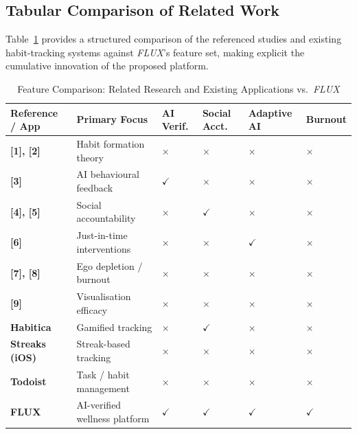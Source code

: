 \documentclass[12pt,a4paper]{article}
\newcommand{\FL}{\textit{FLUX}}
\newcommand{\tick}{\textcolor{fluxgreen}{$\checkmark$}}
\newcommand{\cross}{\textcolor{fluxred}{$\times$}}
\begin{document}
\subsection{Tabular Comparison of Related Work}

Table~\ref{tab:comparison} provides a structured comparison of the referenced studies
and existing habit-tracking systems against \FL{}'s feature set, making explicit the
cumulative innovation of the proposed platform.

\begin{table}[H]
\centering
\caption{Feature Comparison: Related Research and Existing Applications vs.\ \FL{}}
\label{tab:comparison}
\renewcommand{\arraystretch}{1.35}
\begin{tabular}{>{\bfseries}p{2.5cm} p{3.5cm} >{\centering}p{1.6cm} >{\centering}p{1.8cm} >{\centering}p{1.7cm} >{\centering\arraybackslash}p{1.5cm}}
\toprule
\textbf{Reference / App} & \textbf{Primary Focus} & \textbf{AI Verif.} & \textbf{Social Acct.} & \textbf{Adaptive AI} & \textbf{Burnout} \\
\midrule
{[1], [2]}     & Habit formation theory                & \cross & \cross & \cross & \cross \\
{[3]}          & AI behavioural feedback               & \tick  & \cross & \cross & \cross \\
{[4], [5]}     & Social accountability                 & \cross & \tick  & \cross & \cross \\
{[6]}          & Just-in-time interventions            & \cross & \cross & \tick  & \cross \\
{[7], [8]}     & Ego depletion / burnout               & \cross & \cross & \cross & \cross \\
{[9]}          & Visualisation efficacy                & \cross & \cross & \cross & \cross \\
Habitica       & Gamified tracking                     & \cross & \tick  & \cross & \cross \\
Streaks (iOS)  & Streak-based tracking                 & \cross & \cross & \cross & \cross \\
Todoist        & Task / habit management               & \cross & \cross & \cross & \cross \\
\textbf{FLUX}  & AI-verified wellness platform         & \tick  & \tick  & \tick  & \tick  \\
\bottomrule
\end{tabular}
\end{table}
\end{document}
